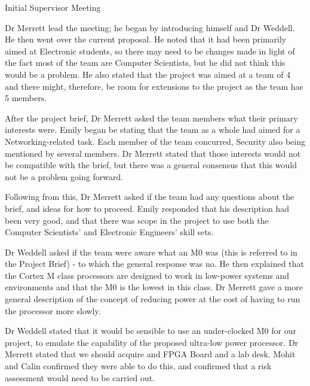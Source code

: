 \documentclass{article}
\begin{document}

\begin{Minutes}{Initial Supervisor Meeting}
\starttime{15:00}
\endtime{16:00}
\location{59/4227}
\maketitle

\topic{Introduction}
Dr Merrett lead the meeting; he began by introducing himself and Dr
Weddell. He then went over the current proposal. He noted that it had
been primarily aimed at Electronic students, so there may need to be
changes made in light of the fact most of the team are Computer
Scientists, but he did not think this would be a problem. He also stated
that the project was aimed at a team of 4 and there might, therefore, be
room for extensions to the project as the team has 5 members.

After the project brief, Dr Merrett asked the team members what their
primary interests were. Emily began be stating that the team as a whole
had aimed for a Networking-related task. Each member of the team
concurred, Security also being mentioned by several members. Dr Merrett
stated that those interests would not be compatible with the brief, but
there was a general consensus that this would not be a problem going
forward.

Following from this, Dr Merrett asked if the team had any questions
about the brief, and ideas for how to proceed. Emily responded that his
description had been very good, and that there was scope in the project
to use both the Computer Scientists' and Electronic Engineers' skill sets.

Dr Weddell asked if the team were aware what an M0 was (this is referred
to in the Project Brief) - to which the general response was no. He then
explained that the Cortex M class processors are designed to work in
low-power systems and environments and that the M0 is the lowest in this
class. Dr Merrett gave a more general description of the concept of
reducing power at the cost of having to run the processor more slowly.

Dr Weddell stated that it would be sensible to use an under-clocked M0
for our project, to emulate the capability of the proposed ultra-low
power processor. Dr Merrett stated that we should acquire and FPGA Board
and a lab desk. Mohit and Calin confirmed they were able to do this, and
confirmed that a risk assessment would need to be carried out.


\end{Minutes}
\end{document}
